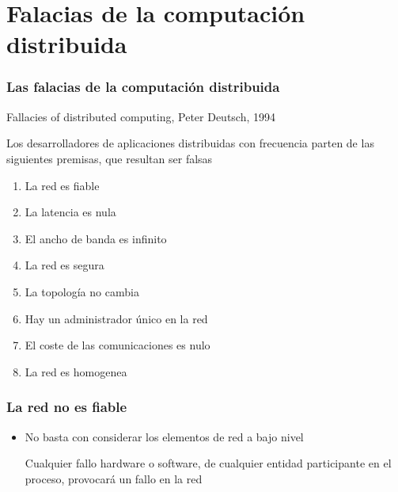 \documentclass[ucs]{beamer}
\begin{document}
\section{Falacias de la computación distribuida}
\begin{frame}[fragile]
\frametitle{Las falacias de la computación distribuida}
Fallacies of distributed computing, Peter Deutsch, 1994

Los desarrolladores de aplicaciones distribuidas con frecuencia parten
de las siguientes premisas, que resultan ser falsas
\begin{enumerate}
\item
La red es fiable
\item
La latencia es nula
\item
El ancho de banda es infinito
\item
La red es segura
\item
La topología no cambia
\item
Hay un administrador único en la red
\item
El coste de las comunicaciones es nulo
\item
La red es homogenea

\end{enumerate}

\end{frame}


\begin{frame}[fragile]
\frametitle{La red no es fiable}
\begin{itemize}
\item

No basta con considerar los elementos de red a bajo nivel

Cualquier fallo hardware o software, de cualquier entidad participante en el proceso,
provocará un fallo en la red

\end{itemize}

\end{frame}
\end{document}
